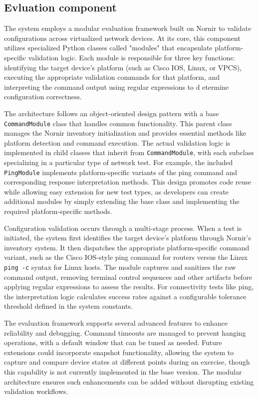     \subsection{Evluation component}

        The system employs a modular evaluation framework built on Nornir to validate configurations across virtualized network devices. 
        At its core, this component utilizes specialized Python classes called "modules" that encapsulate platform-specific validation logic. 
        Each module is responsible for three key functions: identifying the target device's platform (such as Cisco IOS, Linux, or VPCS), 
        executing the appropriate validation commands for that platform, and interpreting the command output using regular expressions to d
        etermine configuration correctness.

        The architecture follows an object-oriented design pattern with a base \texttt{CommandModule} class that handles common functionality. 
        This parent class manages the Nornir inventory initialization and provides essential methods like platform detection and command execution. 
        The actual validation logic is implemented in child classes that inherit from \texttt{CommandModule}, with each subclass specializing in 
        a particular type of network test. For example, the included \texttt{PingModule} implements platform-specific variants of the ping command 
        and corresponding response interpretation methods. This design promotes code reuse while allowing easy extension for new test types, as 
        developers can create additional modules by simply extending the base class and implementing the required platform-specific methods.
        
        Configuration validation occurs through a multi-stage process. When a test is initiated, the system first identifies the target device's 
        platform through Nornir's inventory system. It then dispatches the appropriate platform-specific command variant, such as the Cisco IOS-style 
        ping command for routers versus the Linux \texttt{ping -c} syntax for Linux hosts. The module captures and sanitizes the raw command output, 
        removing terminal control sequences and other artifacts before applying regular expressions to assess the results. For connectivity tests like 
        ping, the interpretation logic calculates success rates against a configurable tolerance threshold defined in the system constants.
        
        The evaluation framework supports several advanced features to enhance reliability and debugging. Command timeouts are managed to prevent 
        hanging operations, with a default window that can be tuned as needed. Future extensions could incorporate snapshot functionality, allowing 
        the system to capture and compare device states at different points during an exercise, though this capability is not currently implemented 
        in the base version. The modular architecture ensures such enhancements can be added without disrupting existing validation workflows.

